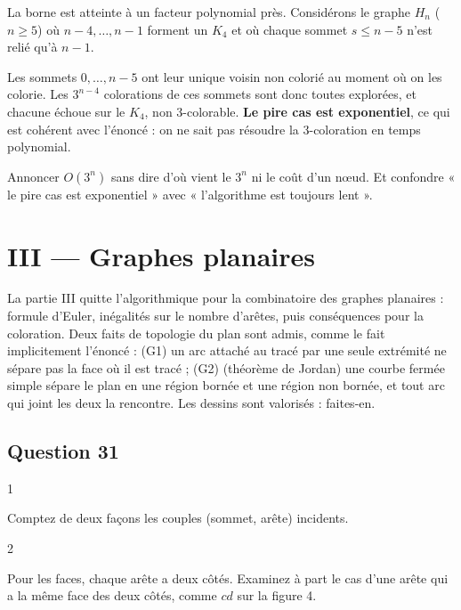 \documentclass[11pt,a4paper]{article}
\begin{document}
La borne est atteinte à un facteur polynomial près. Considérons le graphe \(H_n\) (\(n \ge 5\)) où \(n-4, \dots, n-1\) forment un \(K_4\) et où chaque sommet \(s \le n-5\) n'est relié qu'à \(n-1\).

Les sommets \(0, \dots, n-5\) ont leur unique voisin non colorié au moment où on les colorie. Les \(3^{n-4}\) colorations de ces sommets sont donc toutes explorées, et chacune échoue sur le \(K_4\), non 3-colorable. \textbf{Le pire cas est exponentiel}, ce qui est cohérent avec l'énoncé : on ne sait pas résoudre la 3-coloration en temps polynomial.

\begin{piege}

Annoncer \(O(3^n)\) sans dire d'où vient le \(3^n\) ni le coût d'un nœud. Et confondre « le pire cas est exponentiel » avec « l'algorithme est toujours lent ».

\end{piege}

\hypertarget{iii-graphes-planaires}{%
\section{III --- Graphes planaires}\label{iii-graphes-planaires}}

La partie III quitte l'algorithmique pour la combinatoire des graphes planaires : formule d'Euler, inégalités sur le nombre d'arêtes, puis conséquences pour la coloration. Deux faits de topologie du plan sont admis, comme le fait implicitement l'énoncé : (G1) un arc attaché au tracé par une seule extrémité ne sépare pas la face où il est tracé ; (G2) (théorème de Jordan) une courbe fermée simple sépare le plan en une région bornée et une région non bornée, et tout arc qui joint les deux la rencontre. Les dessins sont valorisés : faites-en.

\hypertarget{question-31}{%
\subsection{Question 31}\label{question-31}}

\begin{indication}{1}

Comptez de deux façons les couples (sommet, arête) incidents.

\end{indication}

\begin{indication}{2}

Pour les faces, chaque arête a deux côtés. Examinez à part le cas d'une arête qui a la même face des deux côtés, comme \(cd\) sur la figure 4.

\end{indication}
\end{document}
